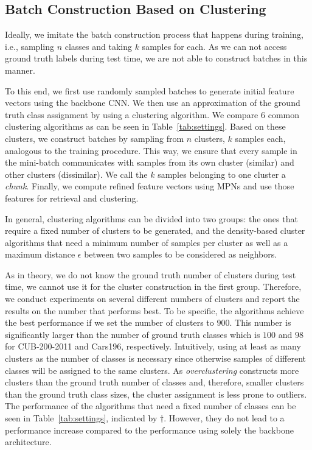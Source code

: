 \documentclass{article}
\begin{document}
\subsection{Batch Construction Based on Clustering}
\label{subsec:test_batches}
Ideally, we imitate the batch construction process that happens during training, i.e., sampling $n$ classes and taking $k$ samples for each. As we can not access ground truth labels during test time, we are not able to construct batches in this manner.

To this end, we first use randomly sampled batches to generate initial feature vectors using the backbone CNN. We then use an approximation of the ground truth class assignment by using a clustering algorithm. We compare $6$ common clustering algorithms as can be seen in Table~\ref{tab:settings}. 
Based on these clusters, we construct batches by sampling from $n$ clusters, $k$ samples each, analogous to the training procedure. This way, we ensure that every sample in the mini-batch communicates with samples from its own cluster (similar) and other clusters (dissimilar). We call the $k$ samples belonging to one cluster a {\it chunk}.
Finally, we compute refined feature vectors using MPNs and use those features for retrieval and clustering.

In general, clustering algorithms can be divided into two groups: the ones that require a fixed number of clusters to be generated, and the density-based cluster algorithms that need a minimum number of samples per cluster as well as a maximum distance $\epsilon$ between two samples to be considered as neighbors.

As in theory, we do not know the ground truth number of clusters during test time, we cannot use it for the cluster construction in the first group. Therefore, we conduct experiments on several different numbers of clusters and report the results on the number that performs best. To be specific, the algorithms achieve the best performance if we set the number of clusters to $900$. This number is significantly larger than the number of ground truth classes which is $100$ and $98$ for CUB-200-2011 and Cars196, respectively. 
Intuitively, using at least as many clusters as the number of classes is necessary since otherwise samples of different classes will be assigned to the same clusters. As \textit{overclustering} constructs more clusters than the ground truth number of classes and, therefore, smaller clusters than the ground truth class sizes, the cluster assignment is less prone to outliers. 
The performance of the algorithms that need a fixed number of classes can be seen in Table~\ref{tab:settings}, indicated by $\dagger$. However, they do not lead to a performance increase compared to the performance using solely the backbone architecture.
\end{document}
